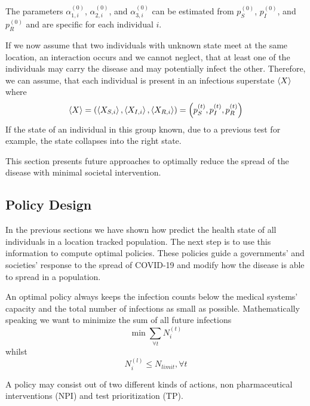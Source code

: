 The parameters $\alpha_{1,i}^{(0)}$, $\alpha_{2,i}^{(0)}$, and $\alpha_{3,i}^{(0)}$ can be estimated from $p_S^{(0)}$, $p_I^{(0)}$, and $p_R^{(0)}$ and are specific for each individual $i$.

If we now assume that two individuals with unknown state meet at the same location, an interaction occurs and we cannot neglect, that at least one of the individuals may carry the disease and may potentially infect the other. Therefore, we can assume, that each individual is present in an infectious superstate $\braket{X}$ where
\begin{equation}
    \braket{X} = \left(\braket{X_{S,i}}, \braket{X_{I,i}}, \braket{X_{R,i}}\right) = \left(p_S^{(t)},p_I^{(t)},p_R^{(t)}\right)
\end{equation}
If the state of an individual in this group known, due to a previous test for example, the state collapses into the right state.



This section presents future approaches to optimally reduce the spread of the disease with minimal societal intervention.


\subsection{Policy Design}
In the previous sections we have shown how predict the health state of all individuals in a location tracked population.
The next step is to use this information to compute optimal policies.
These policies guide a governments' and societies' response to the spread of COVID-19 and modify how the disease is able to spread in a population.

An optimal policy always keeps the infection counts below the medical systems' capacity and the total number of infections as small as possible.
Mathematically speaking we want to minimize the sum of all future infections
\begin{equation}\label{eq:number-of-infected}
	\min \sum_{\forall t} N^{(t)}_i
\end{equation}
whilst
\begin{equation}\label{eq:cap-constraint}
	N^{(l)}_i \leq N_{limit}, \forall t
\end{equation}

A policy may consist out of two different kinds of actions, non pharmaceutical interventions (NPI) and test prioritization (TP).


